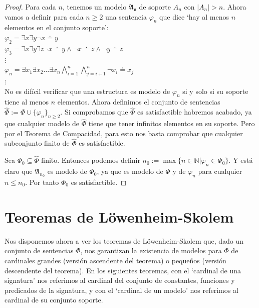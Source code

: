 \begin{proof}
Para cada $n$, tenemos un modelo $\mathfrak{A_n}$ de soporte $A_n$ con $|A_n|>n$.
Ahora vamos a definir para cada $n\geq2$ una sentencia $\varphi_n$ que dice `hay al menos $n$ elementos en el conjunto soporte':\\
$\varphi_2=\exists x\exists y\neg x\doteq y$\\
$\varphi_3=\exists x\exists y\exists z\neg x\doteq y\land\neg x\doteq z\land\neg y\doteq z$\\
$\vdots$\\
$\varphi_n=\exists x_1\exists x_2\dots\exists x_n\bigwedge_{i=1}^n\bigwedge_{j=i+1}^n\neg x_i\doteq x_j$\\
$\vdots$\\

No es difícil verificar que una estructura es modelo de $\varphi_n$ si y solo si su soporte tiene al menos $n$ elementos.
Ahora definimos el conjunto de sentencias $\hat{\Phi}:=\Phi\cup\{\varphi_n\}_{n\geq2}$.
Si comprobamos que $\hat{\Phi}$ es satisfactible habremos acabado, ya que cualquier modelo de $\hat{\Phi}$ tiene que tener infinitos elementos en su soporte. Pero por el Teorema de Compacidad, para esto nos basta comprobar que cualquier subconjunto finito de $\hat{\Phi}$ es satisfactible.

Sea $\Phi_0\subseteq\hat{\Phi}$ finito. Entonces podemos definir $n_0:=\max\{n\in\mathbb{N}|\varphi_n\in\Phi_0\}$. Y está claro que $\mathfrak{A}_{n_0}$ es modelo de $\Phi_0$, ya que es modelo de $\Phi$ y de $\varphi_n$ para cualquier $n\leq n_0$. Por tanto $\Phi_0$ es satisfactible.
\end{proof}

\section{Teoremas de Löwenheim-Skolem}

Nos disponemos ahora a ver los teoremas de Löwenheim-Skolem que, dado un conjunto de sentencias $\Phi$, nos garantizan la existencia de modelos para $\Phi$ de cardinales grandes (versión ascendente del teorema) o pequeños (versión descendente del teorema). En los siguientes teoremas, con el `cardinal de una signatura' nos referimos al cardinal del conjunto de constantes, funciones y predicados de la signatura, y con el `cardinal de un modelo' nos referimos al cardinal de su conjunto soporte.

